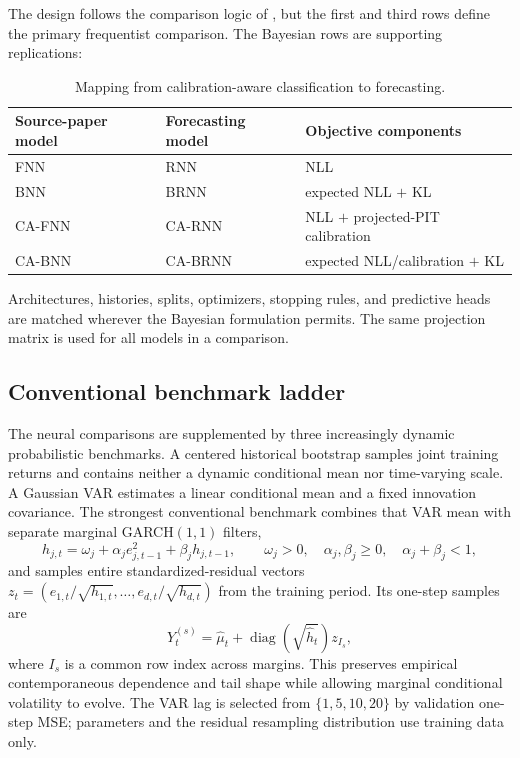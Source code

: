 \documentclass[11pt]{article}
\begin{document}
The design follows the comparison logic of \cite{huang2024cabl}, but the first
and third rows define the primary frequentist comparison. The Bayesian rows are
supporting replications:
\begin{table}[ht]
\centering
\caption{Mapping from calibration-aware classification to forecasting.}
\begin{tabular}{lll}
\toprule
Source-paper model & Forecasting model & Objective components \\
\midrule
FNN & RNN & NLL \\
BNN & BRNN & expected NLL $+$ KL \\
CA-FNN & CA-RNN & NLL $+$ projected-PIT calibration \\
CA-BNN & CA-BRNN & expected NLL/calibration $+$ KL \\
\bottomrule
\end{tabular}
\end{table}

Architectures, histories, splits, optimizers, stopping rules, and predictive heads
are matched wherever the Bayesian formulation permits. The same projection matrix
is used for all models in a comparison.

\subsection{Conventional benchmark ladder}

The neural comparisons are supplemented by three increasingly dynamic
probabilistic benchmarks. A centered historical bootstrap samples joint training
returns and contains neither a dynamic conditional mean nor time-varying scale. A
Gaussian VAR estimates a linear conditional mean and a fixed innovation
covariance. The strongest conventional benchmark combines that VAR mean with
separate marginal GARCH$(1,1)$ filters,
\[
 h_{j,t}=\omega_j+\alpha_j e_{j,t-1}^2+\beta_j h_{j,t-1},
 \qquad \omega_j>0,\quad \alpha_j,\beta_j\geq0,\quad
 \alpha_j+\beta_j<1,
\]
and samples entire standardized-residual vectors
$z_t=(e_{1,t}/\sqrt{h_{1,t}},\ldots,e_{d,t}/\sqrt{h_{d,t}})$ from the training
period. Its one-step samples are
\[
 Y_t^{(s)}=\widehat\mu_t+\operatorname{diag}(\sqrt{\widehat h_t})z_{I_s},
\]
where $I_s$ is a common row index across margins. This preserves empirical
contemporaneous dependence and tail shape while allowing marginal conditional
volatility to evolve. The VAR lag is selected from $\{1,5,10,20\}$ by validation
one-step MSE; parameters and the residual resampling distribution use training
data only.
\end{document}
